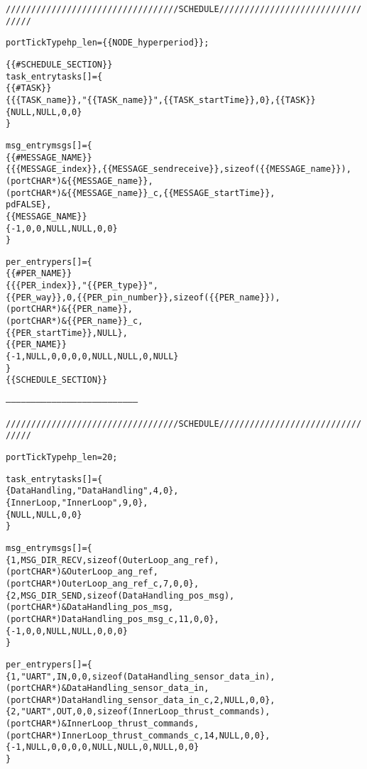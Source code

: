 \begin{alltt}
\scriptsize
////////////////////////////////// SCHEDULE /////////////////////////////////

portTickType hp_len = \{\{NODE_hyperperiod\}\};

\{\{\#SCHEDULE_SECTION\}\}
task\_entry tasks[] = \{
\{\{\#TASK\}\}
   \{ \{\{TASK_name\}\}, "\{\{TASK_name\}\}", \{\{TASK\_startTime\}\}, 0\},\{\{\/TASK\}\}
   \{NULL, NULL, 0, 0\}
\}\;

msg\_entry msgs[] = \{
\{\{\#MESSAGE\_NAME\}\}
   \{ \{\{MESSAGE\_index\}\}, \{\{MESSAGE\_sendreceive\}\}, sizeof( \{\{MESSAGE\_name\}\} ), 
         (portCHAR *) \& \{\{MESSAGE\_name\}\}, 
         (portCHAR *) \& \{\{MESSAGE\_name\}\}\_c, \{\{MESSAGE\_startTime\}\}, 
         pdFALSE\},
\{\{\/MESSAGE\_NAME\}\}
   \{ -1, 0, 0, NULL, NULL, 0, 0\}
\}\;

per\_entry pers[] = \{
\{\{\#PER_NAME\}\}
   \{ \{\{PER\_index\}\}, "\{\{PER\_type\}\}", 
         \{\{PER\_way\}\}, 0, \{\{PER\_pin\_number\}\}, sizeof( \{\{PER\_name\}\} ), 
         (portCHAR *) \& \{\{PER\_name\}\}, 
         (portCHAR *) \& \{\{PER\_name\}\}\_c, 
         \{\{PER\_startTime\}\}, NULL\}, 
\{\{\/PER_NAME\}\}
   \{ -1, NULL, 0, 0, 0, 0, NULL, NULL, 0, NULL \}
\}\;
\{\{\/SCHEDULE_SECTION\}\}

-----------------------------------------------------------------------------

////////////////////////////////// SCHEDULE /////////////////////////////////

portTickType hp_len = 20;

task\_entry tasks[] = \{
   \{ DataHandling, "DataHandling", 4, 0\},
   \{ InnerLoop, "InnerLoop", 9, 0\},
   \{NULL, NULL, 0, 0\}
\}\;

msg\_entry msgs[] = \{
   \{ 1, MSG\_DIR\_RECV, sizeof( OuterLoop\_ang\_ref ), 
      (portCHAR *) \& OuterLoop\_ang\_ref, 
      (portCHAR *) OuterLoop_ang\_ref\_c, 7, 0, 0\},
   \{ 2, MSG\_DIR\_SEND, sizeof( DataHandling\_pos\_msg ), 
      (portCHAR *) \& DataHandling\_pos\_msg, 
      (portCHAR *) DataHandling\_pos\_msg\_c, 11, 0, 0\},
   \{ -1, 0, 0, NULL, NULL, 0, 0, 0\}
\}\;

per\_entry pers[] = \{
   \{ 1, "UART", IN, 0, 0, sizeof( DataHandling\_sensor\_data\_in ), 
      (portCHAR *) \& DataHandling\_sensor\_data\_in, 
      (portCHAR *) DataHandling\_sensor\_data\_in\_c, 2, NULL, 0, 0\},
   \{ 2, "UART", OUT, 0, 0, sizeof( InnerLoop\_thrust\_commands ), 
      (portCHAR *) \& InnerLoop\_thrust\_commands, 
      (portCHAR *) InnerLoop\_thrust\_commands\_c, 14, NULL, 0, 0\},
   \{ -1, NULL, 0, 0, 0, 0, NULL, NULL, 0, NULL, 0, 0 \}
\}\;

\end{alltt}

